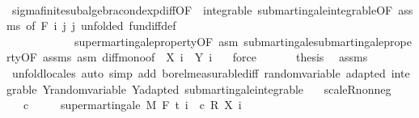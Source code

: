 \begin{isabellebody}
\ \ \ \ \ \ \isamarkupfalse%
\ sigma{\isacharunderscore}{\kern0pt}finite{\isacharunderscore}{\kern0pt}subalgebra{\isachardot}{\kern0pt}cond{\isacharunderscore}{\kern0pt}exp{\isacharunderscore}{\kern0pt}diff{\isacharbrackleft}{\kern0pt}OF\ {\isacharunderscore}{\kern0pt}\ integrable\ submartingale{\isachardot}{\kern0pt}integrable{\isacharbrackleft}{\kern0pt}OF\ assms{\isacharbrackright}{\kern0pt}{\isacharcomma}{\kern0pt}\ of\ {\isachardoublequoteopen}F\ i{\isachardoublequoteclose}\ j\ j{\isacharcomma}{\kern0pt}\ unfolded\ fun{\isacharunderscore}{\kern0pt}diff{\isacharunderscore}{\kern0pt}def{\isacharbrackright}{\kern0pt}\ \isanewline
\ \ \ \ \ \ \ \ \ \ \ \ supermartingale{\isacharunderscore}{\kern0pt}property{\isacharbrackleft}{\kern0pt}OF\ asm{\isacharbrackright}{\kern0pt}\ submartingale{\isachardot}{\kern0pt}submartingale{\isacharunderscore}{\kern0pt}property{\isacharbrackleft}{\kern0pt}OF\ assms\ asm{\isacharbrackright}{\kern0pt}\ diff{\isacharunderscore}{\kern0pt}mono{\isacharbrackleft}{\kern0pt}of\ {\isacharunderscore}{\kern0pt}\ {\isachardoublequoteopen}X\ i\ {\isacharunderscore}{\kern0pt}{\isachardoublequoteclose}\ {\isachardoublequoteopen}Y\ i\ {\isacharunderscore}{\kern0pt}{\isachardoublequoteclose}{\isacharbrackright}{\kern0pt}\ \isamarkupfalse%
\ force\isanewline
\ \ \isacommand{{\isacharbraceright}{\kern0pt}}\isamarkupfalse%
\isanewline
\ \ \isamarkupfalse%
\ {\isacharquery}{\kern0pt}thesis\ \isamarkupfalse%
\ assms\ \isamarkupfalse%
\ {\isacharparenleft}{\kern0pt}unfold{\isacharunderscore}{\kern0pt}locales{\isacharparenright}{\kern0pt}\ {\isacharparenleft}{\kern0pt}auto\ simp\ add{\isacharcolon}{\kern0pt}\ borel{\isacharunderscore}{\kern0pt}measurable{\isacharunderscore}{\kern0pt}diff\ random{\isacharunderscore}{\kern0pt}variable\ adapted\ integrable\ Y{\isachardot}{\kern0pt}random{\isacharunderscore}{\kern0pt}variable\ Y{\isachardot}{\kern0pt}adapted\ submartingale{\isachardot}{\kern0pt}integrable{\isacharparenright}{\kern0pt}\ \ \isanewline
{}\isamarkupfalse%
%
\endisatagproof
{\isafoldproof}%
%
\isadelimproof
\isanewline
%
\endisadelimproof
\isanewline
{}\isamarkupfalse%
\ scaleR{\isacharunderscore}{\kern0pt}nonneg{\isacharcolon}{\kern0pt}\ \isanewline
\ \ \ {\isachardoublequoteopen}c\ {\isasymge}\ {}{\isachardoublequoteclose}\isanewline
\ \ \ {\isachardoublequoteopen}supermartingale\ M\ F\ t\ {\isacharparenleft}{\kern0pt}{\isasymlambda}i\ {\isasymxi}{\isachardot}{\kern0pt}\ c\ {\isacharasterisk}{\kern0pt}\isactrlsub R\ X\ i\ {\isasymxi}{\isacharparenright}{\kern0pt}{\isachardoublequoteclose}\isanewline

\end{isabellebody}
